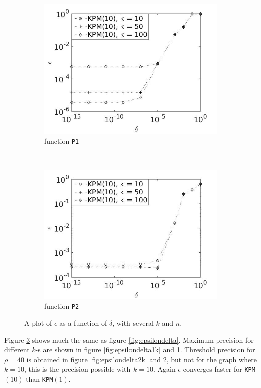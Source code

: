 \begin{figure}[H]
\begin{subfigure}[b]{0.45\textwidth}
                \includegraphics[width=\textwidth]{fig/s22errvstol1k10}
                \caption{function \texttt{P1}}
                \label{fig:epsilondelta3k}
        \end{subfigure}
~
        \begin{subfigure}[b]{0.45\textwidth}
                \includegraphics[width=\textwidth]{fig/s23errvstol2k10}
                \caption{ function \texttt{P2}}
                \label{fig:epsilondelta4k}
        \end{subfigure}
        \caption{A plot of $\epsilon$ as a function of $\delta$, with several $k$ and $n$.} \label{fig:epsilondeltak}
\end{figure}
Figure \ref{fig:epsilondeltak} shows much the same as figure \ref{fig:epsilondelta}. Maximum precision for different $k$-s are shown in figure \ref{fig:epsilondelta1k} and \ref{fig:epsilondelta3k}.
Threshold precision for $\rho = 40$ is obtained in figure \ref{fig:epsilondelta2k} and \ref{fig:epsilondelta4k}, but not for the graph where $k = 10$, this is the precision possible with $k=10$. Again $\epsilon$ converges faster for \texttt{KPM}$(10)$ than \texttt{KPM}$(1)$. \\

